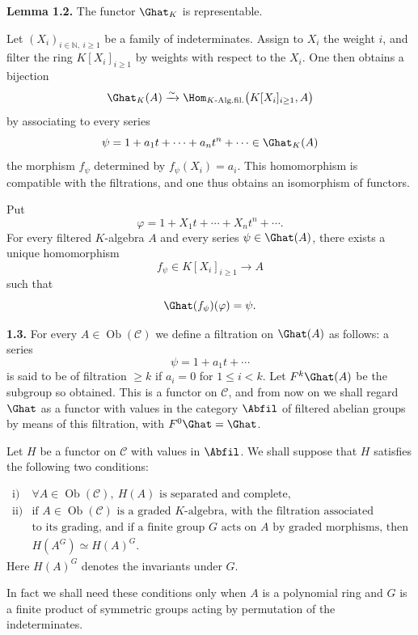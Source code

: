 \textbf{Lemma 1.2.} The functor \(\Ghat_K\) is representable.

Let \((X_i)_{i\in\mathbb N,\ i\geq 1}\) be a family of indeterminates. Assign to \(X_i\) the weight \(i\), and filter the ring \(K[X_i]_{i\geq 1}\) by weights with respect to the \(X_i\). One then obtains a bijection
\[
  \Ghat_K(A)\xrightarrow{\sim}
  \Hom_{K\text{-Alg.fil.}}\bigl(K[X_i]_{i\geq 1},A\bigr)
\]
by associating to every series
\[
  \psi=1+a_1t+\cdots+a_nt^n+\cdots\in\Ghat_K(A)
\]
the morphism \(f_\psi\) determined by \(f_\psi(X_i)=a_i\). This homomorphism is compatible with the filtrations, and one thus obtains an isomorphism of functors.

Put
\[
  \varphi=1+X_1t+\cdots+X_nt^n+\cdots .
\]
For every filtered \(K\)-algebra \(A\) and every series \(\psi\in\Ghat(A)\), there exists a unique homomorphism
\[
  f_\psi\in K[X_i]_{i\geq 1}\longrightarrow A
\]
such that
\[
  \Ghat(f_\psi)(\varphi)=\psi .
\]

\textbf{1.3.} For every \(A\in\operatorname{Ob}(\mathcal C)\) we define a filtration on \(\Ghat(A)\) as follows: a series
\[
  \psi=1+a_1t+\cdots
\]
is said to be of filtration \(\geq k\) if \(a_i=0\) for \(1\leq i<k\). Let \(F^k\Ghat(A)\) be the subgroup so obtained. This is a functor on \(\mathcal C\), and from now on we shall regard \(\Ghat\) as a functor with values in the category \(\Abfil\) of filtered abelian groups by means of this filtration, with \(F^0\Ghat=\Ghat\).

Let \(H\) be a functor on \(\mathcal C\) with values in \(\Abfil\). We shall suppose that \(H\) satisfies the following two conditions:

\[
\begin{array}{ll}
\text{i)} & \forall A\in\operatorname{Ob}(\mathcal C),\ H(A)\text{ is separated and complete},\\[0.3em]
\text{ii)} & \text{if }A\in\operatorname{Ob}(\mathcal C)\text{ is a graded }K\text{-algebra, with the filtration associated}\\
&\text{to its grading, and if a finite group }G\text{ acts on }A\text{ by graded morphisms, then}\\
& H(A^G)\simeq H(A)^G .
\end{array}
\]
Here \(H(A)^G\) denotes the invariants under \(G\).

In fact we shall need these conditions only when \(A\) is a polynomial ring and \(G\) is a finite product of symmetric groups acting by permutation of the indeterminates.

